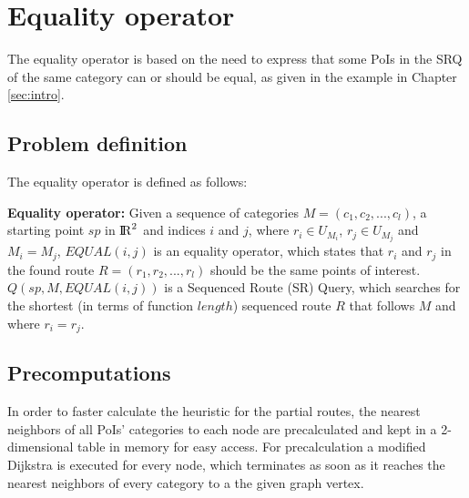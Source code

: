 


\section{Equality operator}
The equality operator is based on the need to express that some PoIs in the SRQ of the same category can or should be equal, as given in the example in Chapter \ref{sec:intro}.

\subsection{Problem definition} 
\label{sec:problemEO}
The equality operator is defined as follows: \newline

\textbf{Equality operator:} Given a sequence of categories $M = (c_1, c_2, ..., c_l)$, a starting point $sp$ in ${\rm I\!R}^2$ and indices $i$ and $j$, where $r_i \in U_{M_{i}}$, $r_j \in U_{M_{j}}$ and $M_i = M_j$, $EQUAL(i, j)$ is an equality operator, which states that $r_i$ and $r_j$ in the found route $R = (r_1, r_2, ..., r_l)$ should be the same points of interest.
$Q(sp, M, EQUAL(i, j))$ is a Sequenced Route (SR) Query, which searches for the shortest (in terms of function $length$) sequenced route $R$ that follows $M$ and where $r_i = r_j$.

\subsection{Precomputations} 
\label{sec:precompEO}
In order to faster calculate the heuristic for the partial routes, the nearest neighbors of all PoIs' categories to each node are precalculated and kept in a 2-dimensional table in memory for easy access. For precalculation a modified Dijkstra is executed for every node, which terminates as soon as it reaches the nearest neighbors of every category to a the given graph vertex.

